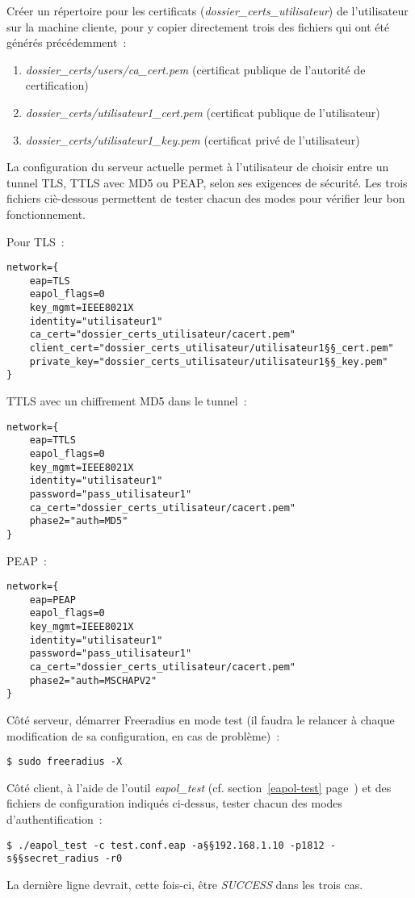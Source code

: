 Créer un répertoire pour les certificats (\emph{dossier\_certs\_utilisateur}) de l'utilisateur sur la machine cliente, pour y copier directement trois des fichiers qui ont été générés précédemment~:

\begin{enumerate}
\item \emph{dossier\_certs/users/ca\_cert.pem} (certificat publique de l'autorité de certification)
\item \emph{dossier\_certs/utilisateur1\_cert.pem} (certificat publique de l'utilisateur)
\item \emph{dossier\_certs/utilisateur1\_key.pem} (certificat privé de l'utilisateur)
\end{enumerate}

La configuration du serveur actuelle permet à l'utilisateur de choisir entre un tunnel TLS, TTLS avec MD5 ou PEAP, selon ses exigences de sécurité. Les trois fichiers ciè-dessous permettent de tester chacun des modes pour vérifier leur bon fonctionnement.

Pour TLS~:

\begin{lstlisting}
network={
    eap=TLS
    eapol_flags=0
    key_mgmt=IEEE8021X
    identity="utilisateur1"
    ca_cert="dossier_certs_utilisateur/cacert.pem"
    client_cert="dossier_certs_utilisateur/utilisateur1§§_cert.pem"
    private_key="dossier_certs_utilisateur/utilisateur1§§_key.pem"
}
\end{lstlisting}

TTLS avec un chiffrement MD5 dans le tunnel~:

\begin{lstlisting}
network={
    eap=TTLS
    eapol_flags=0
    key_mgmt=IEEE8021X
    identity="utilisateur1"
    password="pass_utilisateur1"
    ca_cert="dossier_certs_utilisateur/cacert.pem"
    phase2="auth=MD5"
}
\end{lstlisting}

PEAP~:

\begin{lstlisting}
network={
    eap=PEAP
    eapol_flags=0
    key_mgmt=IEEE8021X
    identity="utilisateur1"
    password="pass_utilisateur1"
    ca_cert="dossier_certs_utilisateur/cacert.pem"
    phase2="auth=MSCHAPV2"
}
\end{lstlisting}

Côté serveur, démarrer Freeradius en mode test (il faudra le relancer à chaque modification de sa configuration, en cas de problème)~:

\begin{lstlisting}
$ sudo freeradius -X
\end{lstlisting}

Côté client, à l'aide de l'outil \emph{eapol\_test} (cf. section~\ref{eapol-test} page~\pageref{eapol-test}) et des fichiers de configuration indiqués ci-dessus, tester chacun des modes d'authentification~:

\begin{lstlisting}
$ ./eapol_test -c test.conf.eap -a§§192.168.1.10 -p1812 -s§§secret_radius -r0
\end{lstlisting}

La dernière ligne devrait, cette fois-ci, être \emph{SUCCESS} dans les trois cas.

